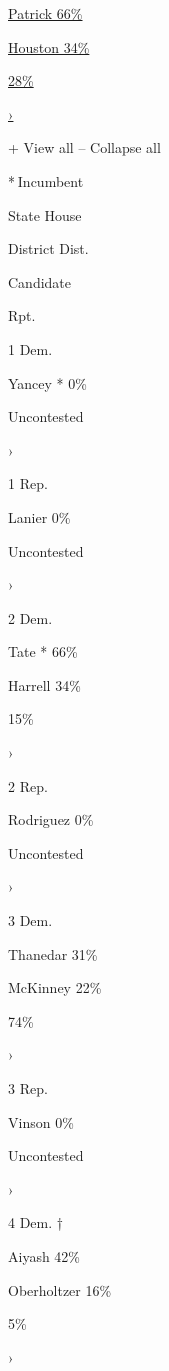 \href{https://www.nytimes3xbfgragh.onion/interactive/2020/08/04/us/elections/results-michigan-house-district-14-primary-election.html}{
Patrick 66\% }

\href{https://www.nytimes3xbfgragh.onion/interactive/2020/08/04/us/elections/results-michigan-house-district-14-primary-election.html}{
Houston 34\% }

\href{https://www.nytimes3xbfgragh.onion/interactive/2020/08/04/us/elections/results-michigan-house-district-14-primary-election.html}{28\%}

\href{https://www.nytimes3xbfgragh.onion/interactive/2020/08/04/us/elections/results-michigan-house-district-14-primary-election.html}{›}

+ View all -- Collapse all

* Incumbent~

State House

District Dist.

Candidate

Rpt.

1 Dem.

 Yancey * 0\%

Uncontested

›

1 Rep.

 Lanier 0\%

Uncontested

›

2 Dem.

 Tate * 66\%

 Harrell 34\%

15\%

›

2 Rep.

 Rodriguez 0\%

Uncontested

›

3 Dem.

 Thanedar 31\%

 McKinney 22\%

74\%

›

3 Rep.

 Vinson 0\%

Uncontested

›

4 Dem. †

 Aiyash 42\%

 Oberholtzer 16\%

5\%

›

